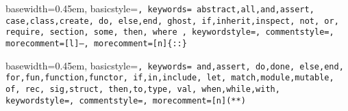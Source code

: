 \renewcommand{\descriptionlabel}[1]{\hspace{5mm}\emph{#1}}




{ basewidth=0.45em,
  basicstyle=\small\tt,
  keywords={
    abstract,all,and,assert,
    case,class,create,
    do,
    else,end,
    ghost,
    if,inherit,inspect,
    not,
    or,
    require,
    section,
    some,
    then,
    where
  },
  keywordstyle=\color{blue},
  commentstyle=\color{brown},
  morecomment=[l]{--},
  morecomment=[n]{\{:}{:\}}
}

 {\lstset{language=alba}} {}







{ basewidth=0.45em,
  basicstyle=\tt\small,
  keywords={
    and,assert,
    do,done,
    else,end,
    for,fun,function,functor,
    if,in,include,
    let,
    match,module,mutable,
    of,
    rec,
    sig,struct,
    then,to,type,
    val,
    when,while,with},
  keywordstyle=\color{blue},
  commentstyle=\color{brown},
  morecomment=[n]{(*}{*)}
}

 {\lstset{language=ocaml}} {}



